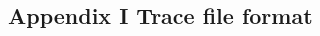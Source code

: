 \documentclass[class=book, crop=false]{standalone}
\begin{document}
\begin{CJK}{UTF8}{gbsn}

\chapter*{Appendix I Trace file format}



\cleardoublepage

\end{CJK}
\end{document}
